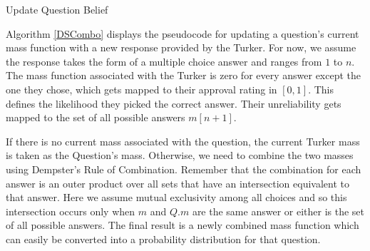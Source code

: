 \begin{algorithm}
	\SetAlgoLined
	\caption{Update Question Belief }
	\label{DSCombo}
\end{algorithm}

Algorithm \ref{DSCombo} displays the pseudocode for updating a question's current mass function with a new response provided by the Turker.  For now, we assume the response takes the form of a multiple choice answer and ranges from $1$ to $n$.  The mass function associated with the Turker is zero for every answer except the one they chose, which gets mapped to their approval rating in $[0,1]$.  This defines the likelihood they picked the correct answer.  Their unreliability gets mapped to the set of all possible answers $m[n+1]$.

If there is no current mass associated with the question, the current Turker mass is taken as the Question's mass.  Otherwise, we need to combine the two masses using Dempster's Rule of Combination.  Remember that the combination for each answer is an outer product over all sets that have an intersection equivalent to that answer.  Here we assume mutual exclusivity among all choices and so this intersection occurs only when $m$ and $Q.m$ are the same answer or either is the set of all possible answers.  The final result is a newly combined mass function which can easily be converted into a probability distribution for that question.


